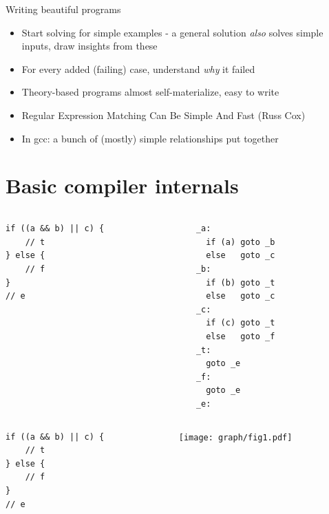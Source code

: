 \documentclass[xcolor = {dvipsnames, table}]{beamer}
\begin{document}
\begin{frame}
    \begin{block}{Writing beautiful programs}
        \begin{itemize}
            \item Start solving for simple examples - a general solution
                \emph{also} solves simple inputs, draw insights from these
            \item For every added (failing) case, understand \emph{why} it failed
            \item Theory-based programs almost self-materialize, easy to write
            \item Regular Expression Matching Can Be Simple And Fast (Russ Cox)
            \item In gcc: a bunch of (mostly) simple relationships put together
        \end{itemize}
    \end{block}
\end{frame}

\section{Basic compiler internals}

\begin{frame}[fragile]
    \begin{columns}
        \begin{column}{0.4\textwidth}
            \begin{lstlisting}[basicstyle = \footnotesize\ttfamily]
if ((a && b) || c) {
    // t
} else {
    // f
}
// e
            \end{lstlisting}
        \end{column}
        \begin{column}{0.4\textwidth}
            \begin{lstlisting}[basicstyle = \footnotesize\ttfamily]
_a:
  if (a) goto _b
  else   goto _c
_b:
  if (b) goto _t
  else   goto _c
_c:
  if (c) goto _t
  else   goto _f
_t:
  goto _e
_f:
  goto _e
_e:
            \end{lstlisting}
        \end{column}
    \end{columns}
\end{frame}

\begin{frame}[fragile]
    \begin{columns}
        \begin{column}{0.4\textwidth}
            \begin{lstlisting}[basicstyle = \footnotesize\ttfamily]
if ((a && b) || c) {
    // t
} else {
    // f
}
// e
            \end{lstlisting}
        \end{column}
        \begin{column}{0.4\textwidth}
            \texttt{[image: graph/fig1.pdf]}
        \end{column}
    \end{columns}
\end{frame}
\end{document}
